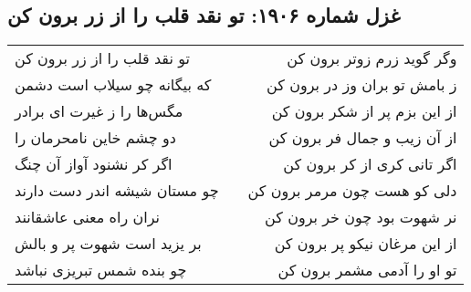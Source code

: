 \begin{center}
\section*{غزل شماره ۱۹۰۶: تو نقد قلب را از زر برون کن}
\label{sec:1906}
\begin{longtable}{l p{0.5cm} r}
تو نقد قلب را از زر برون کن
&&
وگر گوید زرم زوتر برون کن
\\
که بیگانه چو سیلاب است دشمن
&&
ز بامش تو بران وز در برون کن
\\
مگس‌ها را ز غیرت ای برادر
&&
از این بزم پر از شکر برون کن
\\
دو چشم خاین نامحرمان را
&&
از آن زیب و جمال فر برون کن
\\
اگر کر نشنود آواز آن چنگ
&&
اگر تانی کری از کر برون کن
\\
چو مستان شیشه اندر دست دارند
&&
دلی کو هست چون مرمر برون کن
\\
نران راه معنی عاشقانند
&&
نر شهوت بود چون خر برون کن
\\
بر یزید است شهوت پر و بالش
&&
از این مرغان نیکو پر برون کن
\\
چو بنده شمس تبریزی نباشد
&&
تو او را آدمی مشمر برون کن
\\
\end{longtable}
\end{center}
